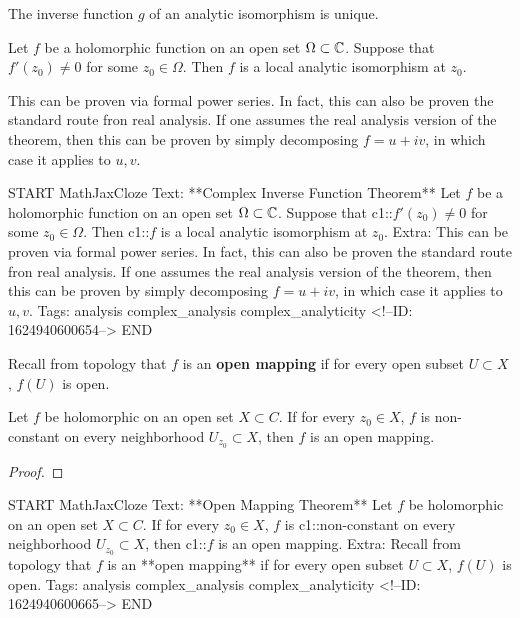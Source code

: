 \documentclass{memoir}
\begin{document}
\begin{prop}
	The inverse function \(g\) of an analytic isomorphism is unique.
\end{prop}

\begin{thm}
	Let \(f\) be a holomorphic function on an open set \(\Omega \subset \mathbb{C}\). Suppose that  \(f'(z_0)\neq 0\) for some \(z_0 \in \Omega \). Then \(f\) is a local analytic isomorphism at \(z_0\).
\end{thm}

This can be proven via formal power series. In fact, this can also be proven the standard route fron real analysis. If one assumes the real analysis version of the theorem, then this can be proven by simply decomposing \(f = u + iv\), in which case it applies to \(u,v\).\\


\begin{anki}
START
MathJaxCloze
Text: **Complex Inverse Function Theorem**
Let \(f\) be a holomorphic function on an open set \(\Omega \subset \mathbb{C}\). Suppose that  {{c1::\(f'(z_0)\neq 0\)}} for some \(z_0 \in \Omega \). Then {{c1::\(f\) is a local analytic isomorphism at \(z_0\)}}.
Extra: This can be proven via formal power series. In fact, this can also be proven the standard route fron real analysis. If one assumes the real analysis version of the theorem, then this can be proven by simply decomposing \(f = u + iv\), in which case it applies to \(u,v\).
Tags: analysis complex_analysis complex_analyticity
<!--ID: 1624940600654-->
END
\end{anki}

Recall from topology that \(f\) is an \textbf{open mapping} if for every open subset \(U\subset X\), \(f(U)\) is open.

\begin{thm}
	Let \(f\) be holomorphic on an open set \(X\subset C\). If for every \(z_0 \in X\), \(f\) is non-constant on every neighborhood \(U_{z_0}\subset X\), then \(f\) is an open mapping.
\end{thm}
\begin{proof}
	
\end{proof}

\begin{anki}
START
MathJaxCloze
Text: **Open Mapping Theorem**
Let \(f\) be holomorphic on an open set \(X\subset C\). If for every \(z_0 \in X\), \(f\) is {{c1::non-constant on every neighborhood \(U_{z_0}\subset X\)}}, then {{c1::\(f\) is an open mapping}}.
Extra: Recall from topology that \(f\) is an **open mapping** if for every open subset \(U\subset X\), \(f(U)\) is open.
Tags: analysis complex_analysis complex_analyticity
<!--ID: 1624940600665-->
END
\end{anki}
\end{document}

